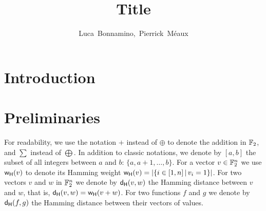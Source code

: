\documentclass[11pt]{llncs}
\begin{document}
	\title{Title}

	
	
	
	\author{
		\mbox{Luca Bonnamino, Pierrick M\'eaux}%
	}
	
	
	
	
	
	
	\maketitle


	
	\begin{abstract}

		
		
	\end{abstract}



\section{Introduction}





\section{Preliminaries}\label{sec:prelim}


For readability, we use the notation $+$ instead of 
$\oplus$ to denote the addition in $\mathbb{F}_2$, and $\sum$ instead of $\bigoplus$. 
In addition to classic notations, we denote by $ [a,b] $ the subset of all integers between $a$ and $b$: $\{a, a+1, \ldots,b\}$. 
For a vector $v\in \mathbb{F}_2^n$ we use $\mathsf{w_H}(v)$ to denote its Hamming weight $\mathsf{w_H}(v)=|\{ i \in [1,n] \, | \, v_i=1 \}|$. 
For two vectors $v$ and $w$ in $\mathbb{F}_2^n$ we denote by $\mathsf{d_H}(v,w)$ the Hamming distance between $v$ and $w$, that is, $\mathsf{d_H}(v,w)=\mathsf{w_H}(v+w)$. 
For two functions $f$ and $g$ we denote by $\mathsf{d_H}(f,g)$ the Hamming distance between their vectors of values.
\end{document}
